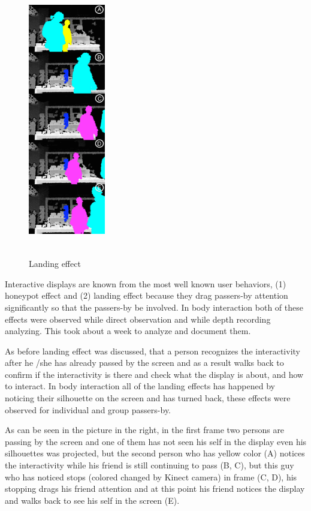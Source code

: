 \begin{figure}
  \vspace{-60pt}
  \begin{center}
    \includegraphics[width=0.3\textwidth,height=120mm]{figures/8/body_inter_findings/effects/landing}
  \end{center}
  \vspace{-20pt}
  \caption{Landing effect}
  \vspace{-10pt}
\end{figure}
Interactive displays are known from the most well known user behaviors, (1) honeypot effect and (2) landing effect because they drag passers-by attention significantly so that the passers-by be involved. In body interaction both of these effects were observed while direct observation and while depth recording analyzing. This took about a week to analyze and document them.

As before landing effect was discussed, that a person recognizes the interactivity after he /she has already passed by the screen and as a result walks back to confirm if the interactivity is there and check what the display is about, and how to interact. In body interaction all of the landing effects has happened by noticing their silhouette on the screen and has turned back, these effects were observed for individual and group passers-by.

As can be seen in the picture in the right, in the first frame two persons are passing by the screen and one of them has not seen his self in the display even his silhouettes was projected, but the second person who has yellow color (A) notices the interactivity while his friend is still continuing to pass (B, C), but this guy who has noticed stops (colored changed by Kinect camera) in frame (C, D), his stopping drags his friend attention and at this point his friend notices the display and walks back to see his self in the screen (E).


